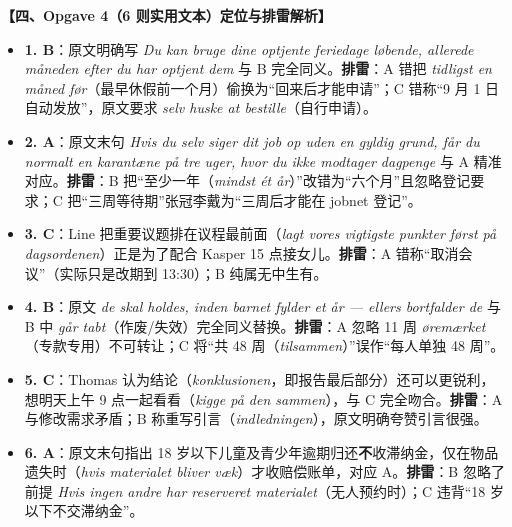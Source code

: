 \begin{answerbox}
\textbf{\color{NCDNavy}【四、Opgave 4（6 则实用文本）定位与排雷解析】}
\begin{itemize}
  \item \textbf{1. B}：原文明确写 \textit{Du kan bruge dine optjente feriedage løbende, allerede måneden efter du har optjent dem} 与 B 完全同义。\textbf{排雷}：A 错把 \textit{tidligst en måned før}（最早休假前一个月）偷换为“回来后才能申请”；C 错称“9 月 1 日自动发放”，原文要求 \textit{selv huske at bestille}（自行申请）。
  \item \textbf{2. A}：原文末句 \textit{Hvis du selv siger dit job op uden en gyldig grund, får du normalt en karantæne på tre uger, hvor du ikke modtager dagpenge} 与 A 精准对应。\textbf{排雷}：B 把“至少一年（\textit{mindst ét år}）”改错为“六个月”且忽略登记要求；C 把“三周等待期”张冠李戴为“三周后才能在 jobnet 登记”。
  \item \textbf{3. C}：Line 把重要议题排在议程最前面（\textit{lagt vores vigtigste punkter først på dagsordenen}）正是为了配合 Kasper 15 点接女儿。\textbf{排雷}：A 错称“取消会议”（实际只是改期到 13:30）；B 纯属无中生有。
  \item \textbf{4. B}：原文 \textit{de skal holdes, inden barnet fylder et år --- ellers bortfalder de} 与 B 中 \textit{går tabt}（作废/失效）完全同义替换。\textbf{排雷}：A 忽略 11 周 \textit{øremærket}（专款专用）不可转让；C 将“共 48 周（\textit{tilsammen}）”误作“每人单独 48 周”。
  \item \textbf{5. C}：Thomas 认为结论（\textit{konklusionen}，即报告最后部分）还可以更锐利，想明天上午 9 点一起看看（\textit{kigge på den sammen}），与 C 完全吻合。\textbf{排雷}：A 与修改需求矛盾；B 称重写引言（\textit{indledningen}），原文明确夸赞引言很强。
  \item \textbf{6. A}：原文末句指出 18 岁以下儿童及青少年逾期归还\textbf{不}收滞纳金，仅在物品遗失时（\textit{hvis materialet bliver væk}）才收赔偿账单，对应 A。\textbf{排雷}：B 忽略了前提 \textit{Hvis ingen andre har reserveret materialet}（无人预约时）；C 违背“18 岁以下不交滞纳金”。
\end{itemize}
\end{answerbox}

